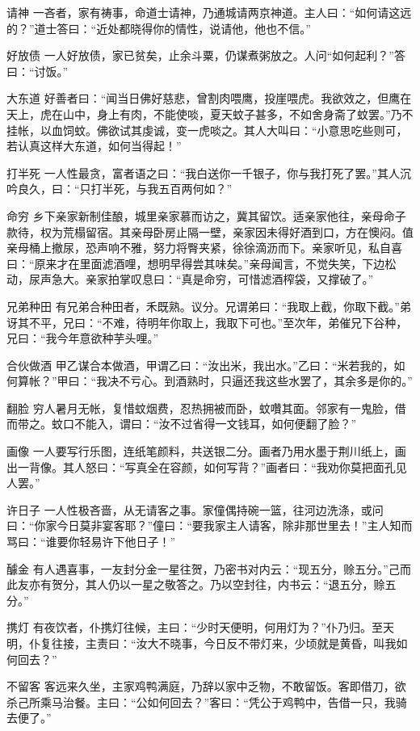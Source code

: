 \documentclass[12pt,UTF8]{ctexbook}
\begin{document}
请神
一吝者，家有祷事，命道士请神，乃通城请两京神道。主人曰：“如何请这远的？”道士答曰：“近处都晓得你的情性，说请他，他也不信。”

好放债
一人好放债，家已贫矣，止余斗粟，仍谋煮粥放之。人问“如何起利？”答曰：“讨饭。”

大东道
好善者曰：“闻当日佛好慈悲，曾割肉喂鹰，投崖喂虎。我欲效之，但鹰在天上，虎在山中，身上有肉，不能使啖，夏天蚊子甚多，不如舍身斋了蚊罢。”乃不挂帐，以血饲蚊。佛欲试其虔诚，变一虎啖之。其人大叫曰：“小意思吃些则可，若认真这样大东道，如何当得起！”

打半死
一人性最贪，富者语之曰：“我白送你一千银子，你与我打死了罢。”其人沉吟良久，曰：“只打半死，与我五百两何如？”

命穷
乡下亲家新制佳酿，城里亲家慕而访之，冀其留饮。适亲家他往，亲母命子款待，权为荒榻留宿。其亲母卧房止隔一壁，亲家因未得好酒到口，方在懊闷。值亲母桶上撤尿，恐声响不雅，努力将臀夹紧，徐徐滴沥而下。亲家听见，私自喜曰：“原来才在里面滤酒哩，想明早得尝其味矣。”亲母闻言，不觉失笑，下边松动，尿声急大。亲家拍掌叹息曰：“真是命穷，可惜滤酒榨袋，又撑破了。”

兄弟种田
有兄弟合种田者，禾既熟。议分。兄谓弟曰：“我取上截，你取下截。”弟讶其不平，兄曰：“不难，待明年你取上，我取下可也。”至次年，弟催兄下谷种，兄曰：“我今年意欲种芋头哩。”

合伙做酒
甲乙谋合本做酒，甲谓乙曰：“汝出米，我出水。”乙曰：“米若我的，如何算帐？”甲曰：“我决不亏心。到酒熟时，只逼还我这些水罢了，其余多是你的。”

翻脸
穷人暑月无帐，复惜蚊烟费，忍热拥被而卧，蚊囋其面。邻家有一鬼脸，借而带之。蚊口不能入，谓曰：“汝不过省得一文钱耳，如何便翻了脸？”

画像
一人要写行乐图，连纸笔颜料，共送银二分。画者乃用水墨于荆川纸上，画出一背像。其人怒曰：“写真全在容颜，如何写背？”画者曰：“我劝你莫把面孔见人罢。”

许日子
一人性极吝啬，从无请客之事。家僮偶持碗一篮，往河边洗涤，或问曰：“你家今日莫非宴客耶？”僮曰：“要我家主人请客，除非那世里去！”主人知而骂曰：“谁要你轻易许下他日子！”

醵金
有人遇喜事，一友封分金一星往贺，乃密书对内云：“现五分，赊五分。”己而此友亦有贺分，其人仍以一星之敬答之。乃以空封往，内书云：“退五分，赊五分。”

携灯
有夜饮者，仆携灯往候，主曰：“少时天便明，何用灯为？”仆乃归。至天明，仆复往接，主责曰：“汝大不晓事，今日反不带灯来，少顷就是黄昏，叫我如何回去？”

不留客
客远来久坐，主家鸡鸭满庭，乃辞以家中乏物，不敢留饭。客即借刀，欲杀己所乘马治餐。主曰：“公如何回去？”客曰：“凭公于鸡鸭中，告借一只，我骑去便了。”
\end{document}
